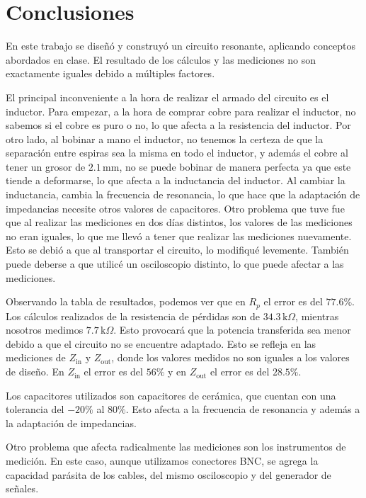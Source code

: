 \section{Conclusiones}

En este trabajo se diseñó y construyó un circuito resonante, aplicando conceptos abordados en clase. El resultado de los cálculos y las mediciones no son 
exactamente iguales debido a múltiples factores.


El principal inconveniente a la hora de realizar el armado del circuito es el inductor. Para empezar, a la hora de comprar cobre para realizar el inductor,
no sabemos si el cobre es puro o no, lo que afecta a la resistencia del inductor. Por otro lado, al bobinar a mano el inductor, no tenemos la certeza de que 
la separación entre espiras sea la misma en todo el inductor, y además el cobre al tener un grosor de $2.1 \, \text{mm}$, no se puede bobinar de manera perfecta ya que 
este tiende a deformarse, lo que afecta a la inductancia del inductor. Al cambiar la inductancia, cambia la frecuencia de resonancia, lo que hace que la adaptación
de impedancias necesite otros valores de capacitores. Otro problema que tuve fue que al realizar las mediciones en dos días distintos,
los valores de las mediciones no eran iguales, lo que me llevó a tener que realizar las mediciones nuevamente. Esto se debió a que al transportar el circuito, lo modifiqué
levemente. También puede deberse a que utilicé un osciloscopio distinto, lo que puede afectar a las mediciones.


Observando la tabla de resultados, podemos ver que en $R_p$ el error es del $77.6\%$. Los cálculos realizados de la resistencia de pérdidas son de $34.3 \, \text{k}\Omega$, mientras
nosotros medimos $7.7 \, \text{k}\Omega$. Esto provocará que la potencia transferida sea menor debido a que el circuito no se encuentre adaptado. Esto se refleja en las 
mediciones de $Z_{\text{in}}$ y $Z_{\text{out}}$, donde los valores medidos no son iguales a los valores de diseño. En $Z_{\text{in}}$ el error es del $56\%$ y en $Z_{\text{out}}$ el error es del $28.5\%$.


Los capacitores utilizados son capacitores de cerámica, que cuentan con una tolerancia del $-20\%$ al $80\%$. Esto afecta a la frecuencia de resonancia y además a la adaptación
de impedancias. 


Otro problema que afecta radicalmente las mediciones son los instrumentos de medición. En este caso, aunque utilizamos conectores BNC,
se agrega la capacidad parásita de los cables, del mismo osciloscopio y del generador de señales. 



